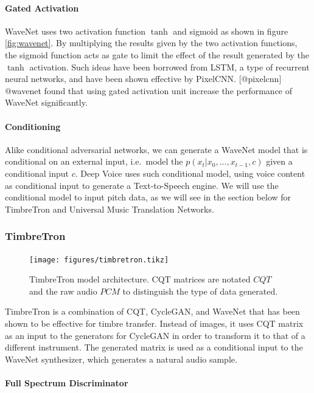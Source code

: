 \documentclass[]{article}
\begin{document}
\paragraph{Gated Activation}

WaveNet uses two activation function \(\tanh\) and sigmoid as shown in
figure \ref{fig:wavenet}. By multiplying the results given by the two
activation functions, the sigmoid function acts as gate to limit the
effect of the result generated by the \(\tanh\) activation. Such ideas
have been borrowed from LSTM, a type of recurrent neural networks, and
have been shown effective by PixelCNN. {[}@pixelcnn{]} @wavenet found
that using gated activation unit increase the performance of WaveNet
significantly.

\paragraph{Conditioning}

Alike conditional adversarial networks, we can generate a WaveNet model
that is conditional on an external input, i.e.~model the
\(p(x_t | x_0, ..., x_{t-1}, c)\) given a conditional input \(c\). Deep
Voice uses such conditional model, using voice content as conditional
input to generate a Text-to-Speech engine. We will use the conditional
model to input pitch data, as we will see in the section below for
TimbreTron and Universal Music Translation Networks.

\hypertarget{timbretron}{%
\subsubsection{TimbreTron}\label{timbretron}}

\begin{figure}[h]
    \texttt{[image: figures/timbretron.tikz]}
    \centering
    \caption{TimbreTron model architecture. CQT matrices are notated $CQT$ and the raw audio $PCM$ to distinguish the type of data generated.} \label{fig:timbretron}
\end{figure}

TimbreTron is a combination of CQT, CycleGAN, and WaveNet that has been
shown to be effective for timbre transfer. Instead of images, it uses
CQT matrix as an input to the generators for CycleGAN in order to
transform it to that of a different instrument. The generated matrix is
used as a conditional input to the WaveNet synthesizer, which generates
a natural audio sample.

\paragraph{Full Spectrum Discriminator}
\end{document}
